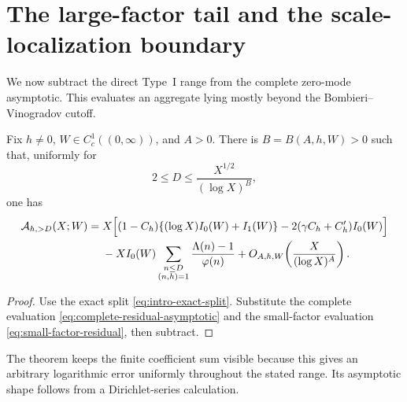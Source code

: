 \section{The large-factor tail and the scale-localization boundary}
\label{sec:tail-mellin-boundary}

We now subtract the direct Type~I range from the complete zero-mode
asymptotic.  This evaluates an aggregate lying mostly beyond the
Bombieri--Vinogradov cutoff.

\begin{theorem}
\label{thm:large-factor-tail}
Fix $h\ne0$, $W\in C_c^1((0,\infty))$, and $A>0$.  There is
$B=B(A,h,W)>0$ such that, uniformly for
\begin{equation}\label{eq:large-tail-D-range}
 2\leq D\leq\frac{X^{1/2}}{(\log X)^B},
\end{equation}
one has
\begin{align}
 \mathcal A_{h,>D}(X;W)
={}&X\Big[(1-C_h)\{(\log X)I_0(W)+I_1(W)\}
       -2(\gamma C_h+C_h')I_0(W)\Big]
 \notag\\
 &-XI_0(W)
 \sum_{\substack{n\leq D\\(n,h)=1}}
 \frac{\Lambda(n)-1}{\varphi(n)}
 +O_{A,h,W}\!\left(\frac{X}{(\log X)^A}\right).
 \label{eq:large-factor-tail}
\end{align}
\end{theorem}

\begin{proof}
Use the exact split \eqref{eq:intro-exact-split}.  Substitute the complete
evaluation \eqref{eq:complete-residual-asymptotic} and the small-factor
evaluation \eqref{eq:small-factor-residual}, then subtract.
\end{proof}

The theorem keeps the finite coefficient sum visible because this gives an
arbitrary logarithmic error uniformly throughout the stated range.  Its
asymptotic shape follows from a Dirichlet-series calculation.

